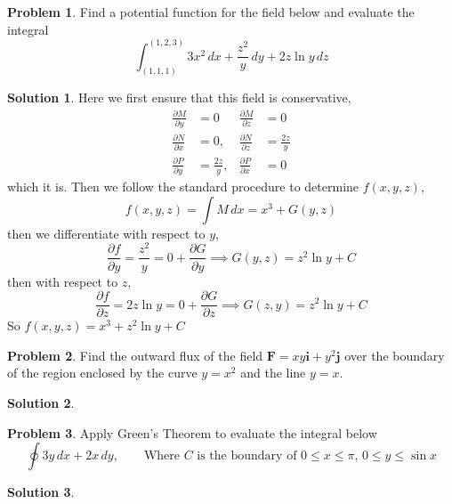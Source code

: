 \documentclass[10pt]{article}
\theoremstyle{definition}
\newtheorem{problem}{Problem}
\newtheorem{soln}{Solution}
\newcommand{\ui}{\mathbf{i}}
\newcommand{\uj}{\mathbf{j}}
\begin{document}
\begin{problem}
Find a potential function for the field below and evaluate the integral
$$\int_{(1,1,1)}^{(1,2,3)}3x^2\,dx+\frac{z^2}{y}\,dy+2z\ln y\,dz$$
\end{problem}
\begin{soln}
  Here we first ensure that this field is conservative,
  \begin{align*}
    \frac{\partial M}{\partial y} & =0
                                  & \frac{\partial M}{\partial z} & =0            \\
    \frac{\partial N}{\partial x} & =0,
                                  & \frac{\partial N}{\partial z} & =\frac{2z}{y} \\
    \frac{\partial P}{\partial y} & =\frac{2z}{y},
                                  & \frac{\partial P}{\partial x} & =0
  \end{align*}
  which it is. Then we follow the standard procedure to determine $f(x,y,z)$,
  $$f(x,y,z)=\int M\,dx=x^3+G(y,z)$$
  then we differentiate with respect to $y$,
  $$\frac{\partial f}{\partial y}=\frac{z^2}{y}=0+\frac{\partial G}{\partial y}
    \implies G(y,z)=z^2\ln y+C$$
  then with respect to $z$,
  $$\frac{\partial f}{\partial z}=2z\ln y=0+\frac{\partial G}{\partial z}
    \implies G(z,y)=z^2\ln y + C$$
  So $f(x,y,z)=x^3+z^2\ln y + C$
\end{soln}

\begin{problem}
Find the outward flux of the field $\mathbf{F} = xy\ui + y^2\uj$ over the boundary of the region enclosed by
the curve $y = x^2$ and the line $y = x$.
\end{problem}
\begin{soln}
\end{soln}

\begin{problem}
Apply Green's Theorem to evaluate the integral below
$$\oint 3y\,dx+2x\,dy,\qquad\text{Where $C$ is the boundary of } 0\leq x\leq\pi,\,0\leq y\leq \sin x$$
\end{problem}
\begin{soln}
\end{soln}
\end{document}
